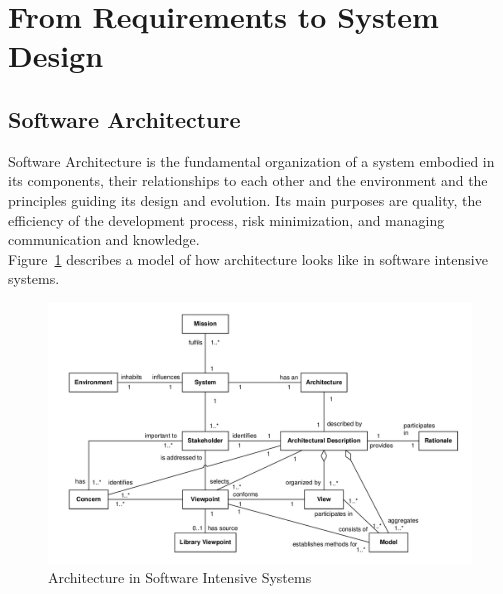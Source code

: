 
\section{From Requirements to System Design}
\subsection{Software Architecture}
Software Architecture is the fundamental organization of a system embodied in its components, their relationships to each other and the environment and the principles guiding its design and evolution.
Its main purposes are quality, the efficiency of the development process, risk minimization, and managing communication and knowledge.\\
Figure~\ref{fig:software_intensive_system_architecture} describes a model of how architecture looks like in software intensive systems.
\begin{figure}[h]
  \centering
  \includegraphics[width=.8\textwidth]{images/software_intensive_system_architecture.png}
  \caption{Architecture in Software Intensive Systems}\label{fig:software_intensive_system_architecture}
\end{figure}

